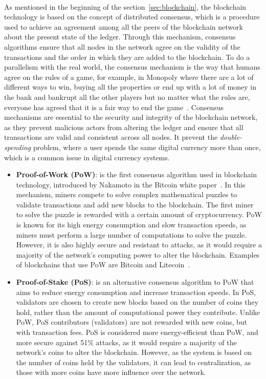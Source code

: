\paragraph{}

As mentioned in the beginning of the section~\ref{sec:blockchain}, the blockchain technology is based on the concept of distributed consensus, which is a procedure used to achieve an
agreement among all the peers of the blockchain network about the present state of the ledger. Through this mechanism, consensus algorithms ensure that all nodes in the network agree on the validity of the transactions and the order in which they are added to the blockchain.
To do a parallelism with the real world, the consensus mechanism is the way that humans agree on the rules of a game, for example, in Monopoly where there are a lot of different ways to win, buying all the properties or end up with a lot of money in the bank
and bankrupt all the other players but no matter what the rules are, everyone has agreed that it is a fair way to end the game~\cite{whatIsConsensus}.
Consensus mechanisms are essential to the security and integrity of the blockchain network, as they prevent malicious actors from altering the ledger and ensure that all transactions are valid and consistent across all nodes.
It prevent the \textit{double-spending} problem, where a user spends the same digital currency more than once, which is a common issue in digital currency systems.

\begin{itemize}
    \item \textbf{Proof-of-Work (PoW)}: is the first consensus algorithm used in blockchain technology, introduced by Nakamoto in the Bitcoin white paper~\cite{nakamoto2008bitcoin}.
          In this mechanism, miners compete to solve complex mathematical puzzles to validate transactions and add new blocks to the blockchain. The first miner to solve the puzzle is rewarded with a certain amount of cryptocurrency.
          PoW is known for its high energy consumption and slow transaction speeds, as miners must perform a large number of computations to solve the puzzle. However, it is also highly secure and resistant to attacks, as it would require a majority of the network's computing power to alter the blockchain.
          Examples of blockchains that use PoW are Bitcoin and Litecoin~\cite{takashima2018litecoin}.
    \item \textbf{Proof-of-Stake (PoS)}: is an alternative consensus algorithm to PoW that aims to reduce energy consumption and increase transaction speeds.
          In PoS, validators are chosen to create new blocks based on the number of coins they hold, rather than the amount of computational power they contribute.
          Unlike PoW, PoS contributors (validators) are not rewarded with new coins, but with transaction fees. PoS is considered more energy-efficient than PoW, and more secure
          against 51\% attacks, as it would require a majority of the network's coins to alter the blockchain. However, as the system is based on the number of coins held by the validators, it can lead to centralization, as those with more coins have more influence over the network.
\end{itemize}

